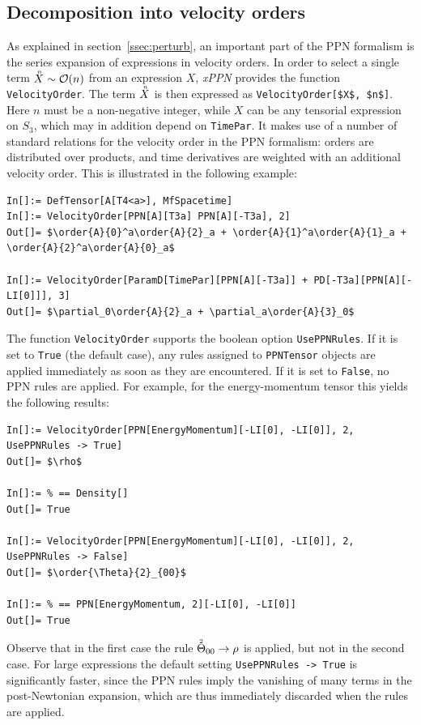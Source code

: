 \documentclass[notitlepage,a4paper,aps,prd,onecolumn,superscriptaddress,nofootinbib,groupedaddress,longbibliography]{revtex4-1}
\newcommand{\order}[2]{\accentset{#2}{#1}}
\newcommand{\xPPN}{\emph{xPPN}}
\begin{document}
\subsection{Decomposition into velocity orders}\label{ssec:veldecomp}
As explained in section~\ref{ssec:perturb}, an important part of the PPN formalism is the series expansion of expressions in velocity orders. In order to select a single term \(\order{X}{n} \sim \mathcal{O}(n)\) from an expression \(X\), \xPPN{} provides the function \lstinline/VelocityOrder/. The term \(\order{X}{n}\) is then expressed as \lstinline/VelocityOrder[$X$, $n$]/. Here \(n\) must be a non-negative integer, while \(X\) can be any tensorial expression on \(S_3\), which may in addition depend on \lstinline/TimePar/. It makes use of a number of standard relations for the velocity order in the PPN formalism: orders are distributed over products, and time derivatives are weighted with an additional velocity order. This is illustrated in the following example:
\begin{lstlisting}
In[]:= DefTensor[A[T4<a>], MfSpacetime]
In[]:= VelocityOrder[PPN[A][T3a] PPN[A][-T3a], 2]
Out[]= $\order{A}{0}^a\order{A}{2}_a + \order{A}{1}^a\order{A}{1}_a + \order{A}{2}^a\order{A}{0}_a$

In[]:= VelocityOrder[ParamD[TimePar][PPN[A][-T3a]] + PD[-T3a][PPN[A][-LI[0]]], 3]
Out[]= $\partial_0\order{A}{2}_a + \partial_a\order{A}{3}_0$
\end{lstlisting}
The function \lstinline/VelocityOrder/ supports the boolean option \lstinline/UsePPNRules/. If it is set to \lstinline/True/ (the default case), any rules assigned to \lstinline/PPNTensor/ objects are applied immediately as soon as they are encountered. If it is set to \lstinline/False/, no PPN rules are applied. For example, for the energy-momentum tensor this yields the following results:
\begin{lstlisting}
In[]:= VelocityOrder[PPN[EnergyMomentum][-LI[0], -LI[0]], 2, UsePPNRules -> True]
Out[]= $\rho$

In[]:= % == Density[]
Out[]= True

In[]:= VelocityOrder[PPN[EnergyMomentum][-LI[0], -LI[0]], 2, UsePPNRules -> False]
Out[]= $\order{\Theta}{2}_{00}$

In[]:= % == PPN[EnergyMomentum, 2][-LI[0], -LI[0]]
Out[]= True
\end{lstlisting}
Observe that in the first case the rule \(\order{\Theta}{2}_{00} \to \rho\) is applied, but not in the second case. For large expressions the default setting \lstinline/UsePPNRules -> True/ is significantly faster, since the PPN rules imply the vanishing of many terms in the post-Newtonian expansion, which are thus immediately discarded when the rules are applied.
\end{document}
